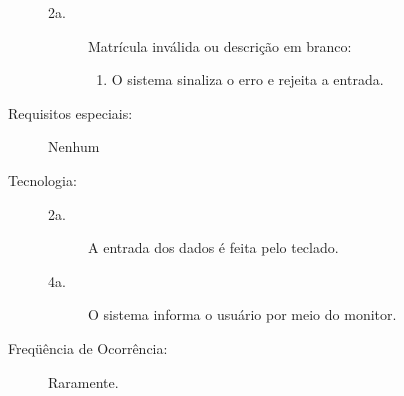 \documentclass[brazil]{abnt}
\begin{document}
\begin{description}
\begin{description}
	\item[2a.] Matrícula inválida ou descrição em branco:
	\begin{enumerate}
		\item  O sistema sinaliza o erro e rejeita a entrada.
	\end{enumerate}
\end{description}
\item[Requisitos especiais:] Nenhum

\item[Tecnologia:] \hfill
\begin{description} 
	\item[2a.] A entrada dos dados é feita pelo teclado.
	\item[4a.] O sistema informa o usuário por meio do monitor.
\end{description}
\item[Freqüência de Ocorrência:] Raramente.

\end{description}
\end{document}
